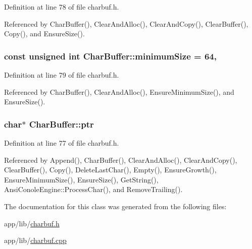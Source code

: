 Definition at line 78 of file charbuf.\+h.



Referenced by Char\+Buffer(), Clear\+And\+Alloc(), Clear\+And\+Copy(), Clear\+Buffer(), Copy(), and Ensure\+Size().

\subsubsection[{\texorpdfstring{minimum\+Size}{minimumSize}}]{\setlength{\rightskip}{0pt plus 5cm}const unsigned int Char\+Buffer\+::minimum\+Size = 64\hspace{0.3cm}{\ttfamily [static]}, {\ttfamily [private]}}\hypertarget{classCharBuffer_a42fcc0397a2d7cb6d412a124de076aff}{}\label{classCharBuffer_a42fcc0397a2d7cb6d412a124de076aff}


Definition at line 79 of file charbuf.\+h.



Referenced by Char\+Buffer(), Clear\+And\+Alloc(), Ensure\+Minimum\+Size(), and Ensure\+Size().

\subsubsection[{\texorpdfstring{ptr}{ptr}}]{\setlength{\rightskip}{0pt plus 5cm}char$\ast$ Char\+Buffer\+::ptr\hspace{0.3cm}{\ttfamily [private]}}\hypertarget{classCharBuffer_a2d313433650506fd6609e6947729dfb0}{}\label{classCharBuffer_a2d313433650506fd6609e6947729dfb0}


Definition at line 77 of file charbuf.\+h.



Referenced by Append(), Char\+Buffer(), Clear\+And\+Alloc(), Clear\+And\+Copy(), Clear\+Buffer(), Copy(), Delete\+Last\+Char(), Empty(), Ensure\+Growth(), Ensure\+Minimum\+Size(), Ensure\+Size(), Get\+String(), Ansi\+Conole\+Engine\+::\+Process\+Char(), and Remove\+Trailing().



The documentation for this class was generated from the following files\+:\begin{DoxyCompactItemize}
\item 
app/lib/\hyperlink{charbuf_8h}{charbuf.\+h}\item 
app/lib/\hyperlink{charbuf_8cpp}{charbuf.\+cpp}\end{DoxyCompactItemize}
